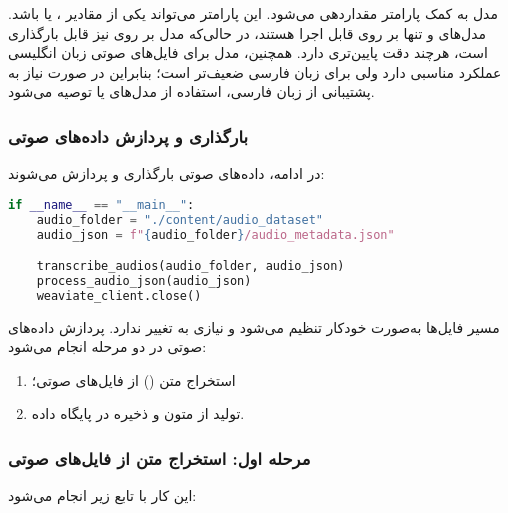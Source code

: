 \documentclass{article}
\begin{document}
مدل  به کمک پارامتر  مقداردهی می‌شود.  
این پارامتر می‌تواند یکی از مقادیر ،  یا  باشد.  
مدل‌های  و  تنها بر روی  قابل اجرا هستند، در حالی‌که مدل  بر روی  نیز قابل بارگذاری است، هرچند دقت پایین‌تری دارد.  
همچنین، مدل  برای فایل‌های صوتی زبان انگلیسی عملکرد مناسبی دارد ولی برای زبان فارسی ضعیف‌تر است؛ بنابراین در صورت نیاز به پشتیبانی از زبان فارسی، استفاده از مدل‌های  یا  توصیه می‌شود.

\subsubsection{بارگذاری و پردازش داده‌های صوتی}

در ادامه، داده‌های صوتی بارگذاری و پردازش می‌شوند:

\begin{latin}
\begin{lstlisting}[language=Python]
if __name__ == "__main__":
    audio_folder = "./content/audio_dataset"
    audio_json = f"{audio_folder}/audio_metadata.json"

    transcribe_audios(audio_folder, audio_json)
    process_audio_json(audio_json)
    weaviate_client.close()
\end{lstlisting}
\end{latin}

مسیر فایل‌ها به‌صورت خودکار تنظیم می‌شود و نیازی به تغییر ندارد.  
پردازش داده‌های صوتی در دو مرحله انجام می‌شود:
\begin{enumerate}
\item استخراج متن () از فایل‌های صوتی؛
\item تولید  از متون و ذخیره در پایگاه داده.
\end{enumerate}

\subsubsection{مرحله اول: استخراج متن از فایل‌های صوتی}

این کار با تابع زیر انجام می‌شود:
\end{document}
